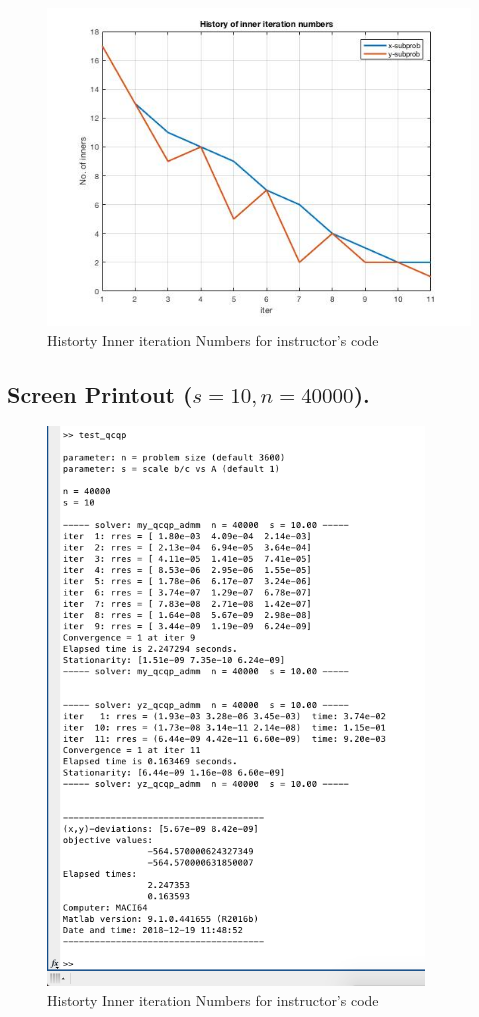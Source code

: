 \begin{figure}[H]
\centering
\includegraphics[width=12cm]{F_8/F_1_4.jpg}
\caption{Historty Inner iteration Numbers for instructor's code}
\end{figure}
\subsection{Screen Printout ($s=10,n=40000$).}
\begin{figure}[H]
\centering
\includegraphics[width=10cm]{F_8/F_1_1.png}
\caption{Historty Inner iteration Numbers for instructor's code}
\end{figure}


